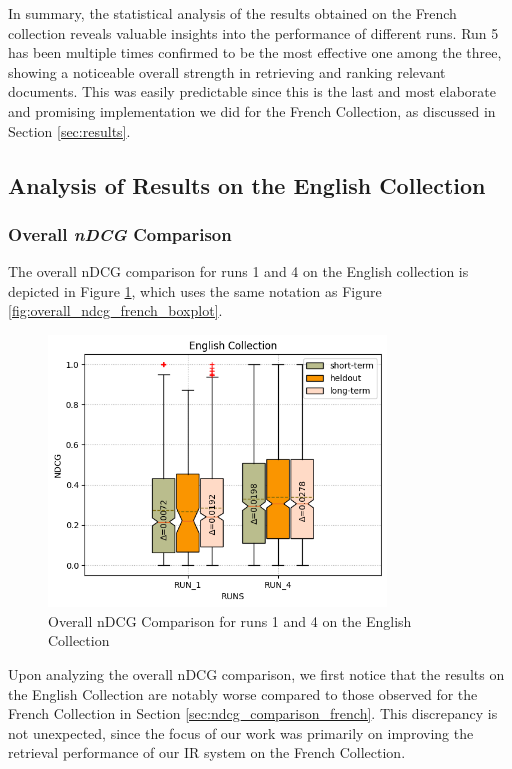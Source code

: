 In summary, the statistical analysis of the results obtained on the French collection reveals valuable insights into the performance of different runs. 
Run 5 has been multiple times confirmed to be the most effective one among the three, showing a noticeable overall strength in retrieving and ranking relevant documents.
This was easily predictable since this is the last and most elaborate and promising implementation we did for the French Collection, as discussed in Section \ref{sec:results}.   


\newpage
\enlargethispage{8\baselineskip}
\subsection{Analysis of Results on the English Collection}

\subsubsection{Overall \textit{nDCG} Comparison} \label{sec:ndcg_comparison_eng}

The overall \ac{nDCG} comparison for runs 1 and 4 on the English collection is depicted in Figure \ref{fig:overall_ndcg_eng}, which uses the same notation as Figure \ref{fig:overall_ndcg_french_boxplot}.

\begin{figure}[!h]
\centering
\includegraphics[width=0.8\textwidth]{figure/StatisticalAnalysis/BoxPlot/NDGC ENGLISH.png}
\caption{Overall nDCG Comparison for runs 1 and 4 on the English Collection}
\label{fig:overall_ndcg_eng}
\end{figure}
 
Upon analyzing the overall \ac{nDCG} comparison, we first notice that the results on the English Collection are notably worse compared to those observed for the French Collection in Section \ref{sec:ndcg_comparison_french}. 
This discrepancy is not unexpected, since the focus of our work was primarily on improving the retrieval performance of our \ac{IR} system on the French Collection.

